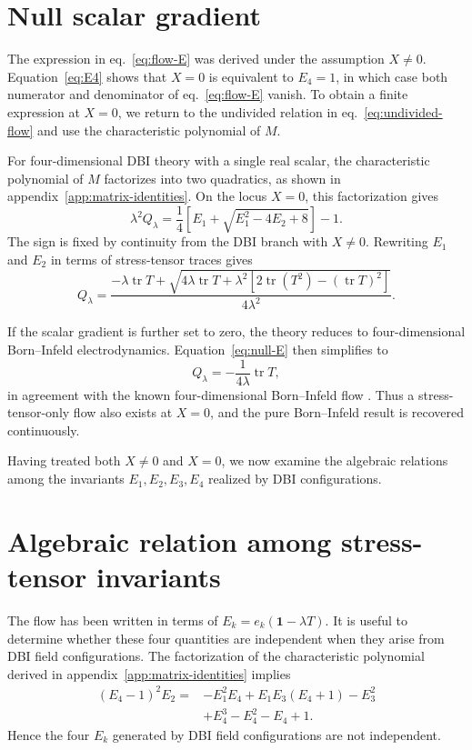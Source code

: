 \documentclass[a4paper,11pt]{article}
\numberwithin{equation}{section}
\newcommand{\tr}{\operatorname{tr}}
\newcommand{\Id}{\mathbf 1}
\begin{document}
\section{Null scalar gradient}
\label{sec:null}

The expression in eq.~\eqref{eq:flow-E} was derived under the assumption $X\neq0$. Equation~\eqref{eq:E4} shows that $X=0$ is equivalent to $E_4=1$, in which case both numerator and denominator of eq.~\eqref{eq:flow-E} vanish. To obtain a finite expression at $X=0$, we return to the undivided relation in eq.~\eqref{eq:undivided-flow} and use the characteristic polynomial of $M$.

For four-dimensional DBI theory with a single real scalar, the characteristic polynomial of $M$ factorizes into two quadratics, as shown in appendix~\ref{app:matrix-identities}. On the locus $X=0$, this factorization gives
\begin{equation}
 \lambda^2Q_\lambda
 =\frac14\left[E_1+\sqrt{E_1^2-4E_2+8}\right]-1.
 \label{eq:null-E}
\end{equation}
The sign is fixed by continuity from the DBI branch with $X\neq0$. Rewriting $E_1$ and $E_2$ in terms of stress-tensor traces gives
\begin{equation}
 Q_\lambda
 =\frac{-\lambda\tr T+
 \sqrt{4\lambda\tr T+\lambda^2\left[2\tr(T^2)-(\tr T)^2\right]}}
 {4\lambda^2}.
 \label{eq:null-T}
\end{equation}

If the scalar gradient is further set to zero, the theory reduces to four-dimensional Born--Infeld electrodynamics. Equation~\eqref{eq:null-E} then simplifies to
\begin{equation}
 Q_\lambda=-\frac{1}{4\lambda}\tr T,
 \label{eq:pure-BI}
\end{equation}
in agreement with the known four-dimensional Born--Infeld flow \cite{Ferko2022,Brizio2026}. Thus a stress-tensor-only flow also exists at $X=0$, and the pure Born--Infeld result is recovered continuously.

Having treated both $X\neq0$ and $X=0$, we now examine the algebraic relations among the invariants $E_1,E_2,E_3,E_4$ realized by DBI configurations.

\section{Algebraic relation among stress-tensor invariants}
\label{sec:constraint}

The flow has been written in terms of $E_k=e_k(\Id-\lambda T)$. It is useful to determine whether these four quantities are independent when they arise from DBI field configurations. The factorization of the characteristic polynomial derived in appendix~\ref{app:matrix-identities} implies
\begin{align}
 (E_4-1)^2E_2={}&-E_1^2E_4+E_1E_3(E_4+1)-E_3^2\nonumber\\
 &+E_4^3-E_4^2-E_4+1.
 \label{eq:algebraic-relation}
\end{align}
Hence the four $E_k$ generated by DBI field configurations are not independent.
\end{document}
